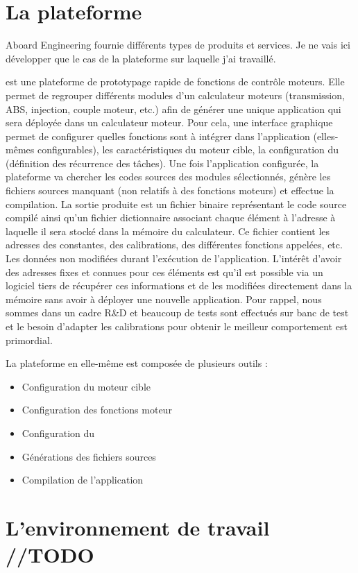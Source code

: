 \section{La plateforme }
\label{sec:orianne}

Aboard Engineering fournie différents types de produits et services. Je ne vais ici développer que le cas de la plateforme  sur laquelle j'ai travaillé.

 est une plateforme de prototypage rapide de fonctions de contrôle moteurs.
Elle permet de regrouper différents modules d'un calculateur moteurs (transmission, ABS, injection, couple moteur, etc.) afin de générer une unique application qui sera déployée dans un calculateur moteur.
Pour cela, une interface graphique permet de configurer quelles fonctions sont à intégrer dans l'application (elles-mêmes configurables), les caractéristiques du moteur cible, la configuration du  (définition des récurrence des tâches).
Une fois l'application configurée, la plateforme va chercher les codes sources des modules sélectionnés, génère les fichiers sources manquant (non relatifs à des fonctions moteurs) et  effectue la compilation.
La sortie produite est un fichier binaire représentant le code source compilé ainsi qu'un fichier \og dictionnaire \fg{} associant chaque élément à l'adresse à laquelle il sera stocké dans la mémoire du calculateur. Ce fichier contient les adresses des constantes, des calibrations, des différentes fonctions appelées, etc. Les données non modifiées durant l'exécution de l'application.
L'intérêt d'avoir des adresses fixes et connues pour ces éléments est qu'il est possible via un logiciel tiers de récupérer ces informations et de les modifiées directement dans la mémoire sans avoir à déployer une nouvelle application. Pour rappel, nous sommes dans un cadre R\&D et beaucoup de tests sont effectués sur banc de test et le besoin d'adapter les calibrations pour obtenir le meilleur comportement est primordial.

La plateforme en elle-même est composée de plusieurs outils :
\begin{itemize}
	\item Configuration du moteur cible
	\item Configuration des fonctions moteur
	\item Configuration du 
	\item Générations des fichiers sources
	\item Compilation de l'application
\end{itemize}

\section{L'environnement de travail //TODO}
\lipsum
